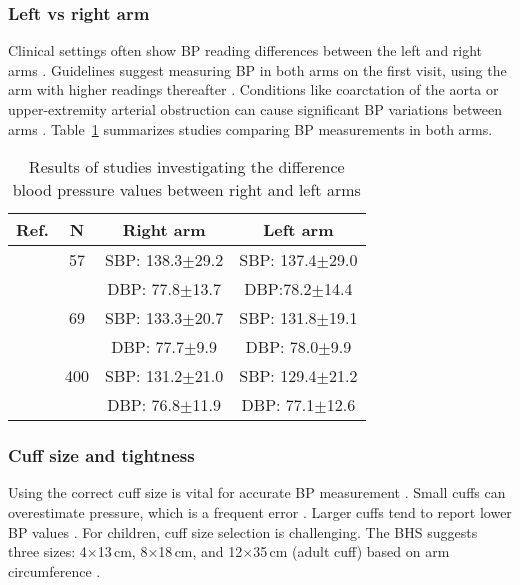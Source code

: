\documentclass[journal,article,moreauthors]{Definitions/mdpi}
\begin{document}
\subsubsection{Left vs right arm}
Clinical settings often show BP reading differences between the left and right arms \citep{fred2013accurate}. Guidelines suggest measuring BP in both arms on the first visit, using the arm with higher readings thereafter \citep{muntner2019measurement}. Conditions like coarctation of the aorta or upper-extremity arterial obstruction can cause significant BP variations between arms \citep{muntner2019measurement}. Table~\ref{Tab: LRarm} summarizes studies comparing BP measurements in both arms.

\begin{table}[tb]
\caption{Results of studies investigating the difference blood pressure values between right and left arms}\label{Tab: LRarm}
\begin{center}
\begin{tabular}{rccc}
\toprule
\textbf{Ref.} & \textbf{N} &\textbf{Right arm} & \textbf{Left arm}\\
\hline
\citep{Netea2003} & 57 &  SBP: 138.3$\pm$29.2 & SBP: 137.4$\pm$29.0
\\ & & DBP: 77.8$\pm$13.7 & DBP:78.2$\pm$14.4 
\\\hline
\citep{netea1999arm} & 69  &SBP: 133.3$\pm$20.7 & SBP: 131.8$\pm$19.1\\ && DBP: 77.7$\pm$9.9 & DBP: 78.0$\pm$9.9 
\\\hline
\citep{lane2002inter} & 400  &  SBP: 131.2$\pm$21.0 & SBP: 129.4$\pm$21.2
\\ && DBP: 76.8$\pm$11.9 & DBP: 77.1$\pm$12.6  
\\
\bottomrule
\end{tabular}
\end{center}
\end{table}

\subsubsection{Cuff size and tightness}
Using the correct cuff size is vital for accurate BP measurement \citep{bur2000accuracy}. Small cuffs can overestimate pressure, which is a frequent error \citep{Palatini2018, ogedegbe2010principles}. Larger cuffs tend to report lower BP values \citep{kallioinen2017sources}. For children, cuff size selection is challenging. The BHS suggests three sizes: 4$\times$13\,cm, 8$\times$18\,cm, and 12$\times$35\,cm (adult cuff) based on arm circumference \citep{ogedegbe2010principles}.
\end{document}
